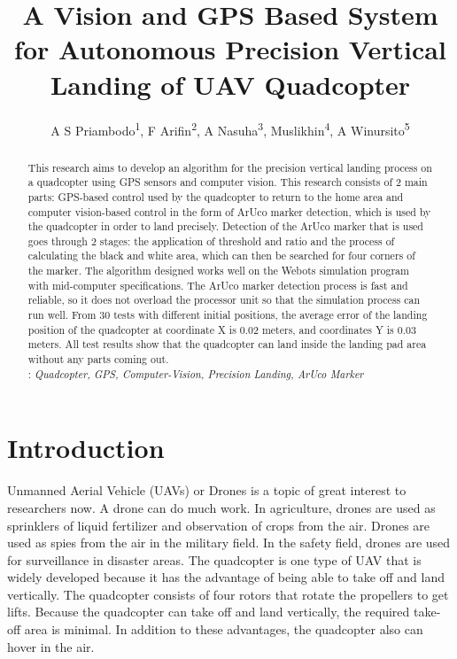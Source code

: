 \documentclass[a4paper]{jpconf}
\begin{document}
\title{A Vision and GPS Based System for Autonomous Precision Vertical Landing of UAV Quadcopter}

\author{A S Priambodo\textsuperscript{1}, F Arifin\textsuperscript{2}, A Nasuha\textsuperscript{3}, Muslikhin\textsuperscript{4}, A Winursito\textsuperscript{5}}

\address{\textsuperscript{1,2,3,4,5}Department of Electronics and Informatics Engineering of Education, Engineering Faculty, Universitas Negeri Yogyakarta, Indonesia}


\begin{abstract}
    This research aims to develop an algorithm for the precision vertical landing process on a quadcopter using GPS sensors and computer vision. This research consists of 2 main parts: GPS-based control used by the quadcopter to return to the home area and computer vision-based control in the form of ArUco marker detection, which is used by the quadcopter in order to land precisely. Detection of the ArUco marker that is used goes through 2 stages: the application of threshold and ratio and the process of calculating the black and white area, which can then be searched for four corners of the marker. The algorithm designed works well on the Webots simulation program with mid-computer specifications. The ArUco marker detection process is fast and reliable, so it does not overload the processor unit so that the simulation process can run well. From 30 tests with different initial positions, the average error of the landing position of the quadcopter at coordinate X is 0.02 meters, and coordinates Y is 0.03 meters. All test results show that the quadcopter can land inside the landing pad area without any parts coming out.\\

    : \it Quadcopter, GPS, Computer-Vision, Precision Landing, ArUco Marker

\end{abstract}

\section{Introduction}
Unmanned Aerial Vehicle (UAVs) or Drones is a topic of great interest to researchers now. A drone can do much work. In agriculture, drones are used as sprinklers of liquid fertilizer and observation of crops from the air\cite{ref1}. Drones are used as spies from the air in the military field\cite{ref2}. In the safety field, drones are used for surveillance in disaster areas\cite{ref3}. The quadcopter is one type of UAV that is widely developed because it has the advantage of being able to take off and land vertically. The quadcopter consists of four rotors that rotate the propellers to get lifts. Because the quadcopter can take off and land vertically, the required take-off area is minimal. In addition to these advantages, the quadcopter also can hover in the air.
\end{document}
